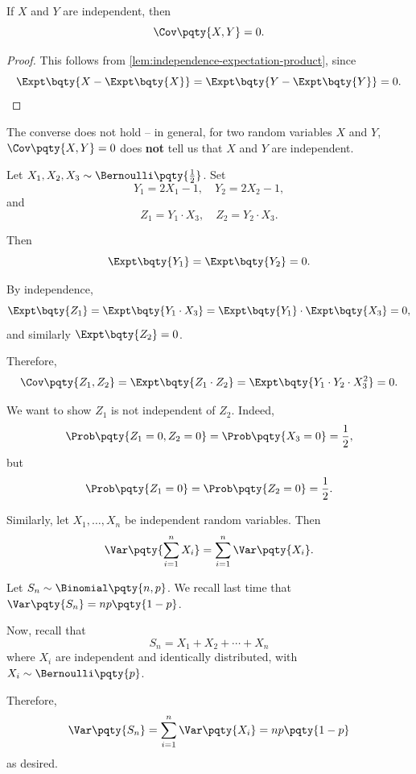 \begin{proposition}
    If \(X\) and \(Y\) are independent, then
    \[
        \Cov\pqty{X, Y} = 0.
    \]
\end{proposition}

\begin{proof}
    This follows from \autoref{lem:independence-expectation-product}, since
    \[
        \Expt\bqty{X - \Expt\bqty{X}} = \Expt\bqty{Y - \Expt\bqty{Y}} = 0.
    \]
\end{proof}

The converse does not hold -- in general, for two random variables \(X\) and \(Y\), \(\Cov\pqty{X, Y} = 0\) does \textbf{not} tell us that \(X\) and \(Y\) are independent.

\begin{example}
    \label{ex:zero-variance-no-independent}%
    Let \(X_1, X_2, X_3 \sim \Bernoulli\pqty{\frac{1}{2}}\). Set
    \[
        Y_1 = 2 X_1 - 1, \quad Y_2 = 2 X_2 - 1,
    \]
    and
    \[
        Z_1 = Y_1 \cdot X_3, \quad Z_2 = Y_2 \cdot X_3.
    \]

    Then
    \[
        \Expt\bqty{Y_1} = \Expt\bqty{Y_2} = 0.
    \]

    By independence,
    \[
        \Expt\bqty{Z_1} = \Expt\bqty{Y_1 \cdot X_3} = \Expt\bqty{Y_1} \cdot \Expt\bqty{X_3} = 0,
    \]
    and similarly \(\Expt\bqty{Z_2} = 0\).

    Therefore,
    \[
        \Cov\pqty{Z_1, Z_2} = \Expt\bqty{Z_1 \cdot Z_2} = \Expt\bqty{Y_1 \cdot Y_2 \cdot X_3^2} = 0.
    \]

    We want to show \(Z_1\) is not independent of \(Z_2\). Indeed,
    \[
        \Prob\pqty{Z_1 = 0, Z_2 = 0} = \Prob\pqty{X_3 = 0} = \frac{1}{2},
    \]
    but
    \[
        \Prob\pqty{Z_1 = 0} = \Prob\pqty{Z_2 = 0} = \frac{1}{2}.
    \]
\end{example}

Similarly, let \(X_1, \ldots, X_n\) be independent random variables. Then
\[
    \Var\pqty{\sum_{i = 1}^{n} X_i} = \sum_{i = 1}^{n} \Var\pqty{X_i}.
\]

\begin{example}
    \label{ex:binomial-sum-bernoulli}%
    Let \(S_n \sim \Binomial\pqty{n, p}\). We recall last time that \(\Var\pqty{S_n} = n p \pqty{1 - p}\).

    Now, recall that
    \[
        S_n = X_1 + X_2 + \cdots + X_n
    \]
    where \(X_i\) are independent and identically distributed, with \(X_i \sim \Bernoulli\pqty{p}\).

    Therefore,
    \[
        \Var\pqty{S_n} = \sum_{i = 1}^{n} \Var\pqty{X_i} = np \pqty{1 - p}
    \]
    as desired.
\end{example}